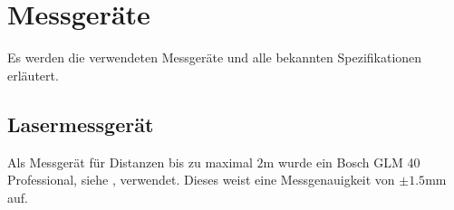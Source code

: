 \section{Messgeräte}\label{anhang:messung:messgeraete}
Es werden die verwendeten Messgeräte und alle bekannten Spezifikationen erläutert.

\subsection{Lasermessgerät}

Als Messgerät für Distanzen bis zu maximal $2\si{\metre}$ wurde ein Bosch GLM 40 Professional, siehe \cite{bosch:glm40}, verwendet.
Dieses weist eine Messgenauigkeit von $\pm 1.5\si{\milli\metre}$ auf.
